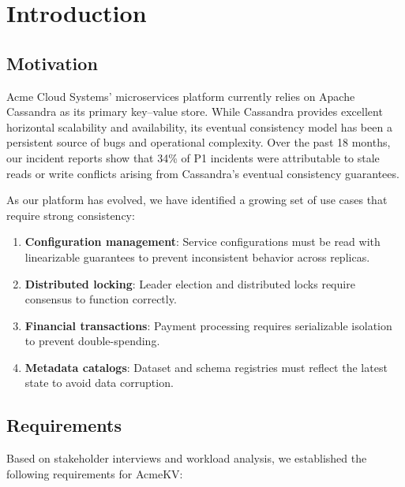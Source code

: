\documentclass[12pt,a4paper]{report}
\begin{document}
\tableofcontents
\listoftables

\chapter{Introduction}
\label{ch:introduction}

\section{Motivation}

Acme Cloud Systems' microservices platform currently relies on Apache Cassandra as its primary key--value store. While Cassandra provides excellent horizontal scalability and availability, its eventual consistency model has been a persistent source of bugs and operational complexity. Over the past 18 months, our incident reports show that 34\% of P1 incidents were attributable to stale reads or write conflicts arising from Cassandra's eventual consistency guarantees.

As our platform has evolved, we have identified a growing set of use cases that require strong consistency:
\begin{enumerate}[itemsep=4pt]
  \item \textbf{Configuration management}: Service configurations must be read with linearizable guarantees to prevent inconsistent behavior across replicas.
  \item \textbf{Distributed locking}: Leader election and distributed locks require consensus to function correctly.
  \item \textbf{Financial transactions}: Payment processing requires serializable isolation to prevent double-spending.
  \item \textbf{Metadata catalogs}: Dataset and schema registries must reflect the latest state to avoid data corruption.
\end{enumerate}

\section{Requirements}

Based on stakeholder interviews and workload analysis, we established the following requirements for AcmeKV:
\end{document}
